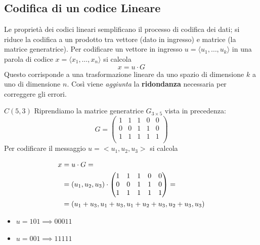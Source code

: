 \subsection{Codifica di un codice Lineare}
Le proprietà dei codici lineari semplificano il processo di codifica dei dati; si riduce la codifica a un prodotto tra vettore (dato in ingresso) e matrice (la matrice generatrice).
Per codificare un vettore in ingresso $u=\langle u_1,\dots,u_k \rangle$ in una parola di codice $x=\langle x_1,\dots,x_n\rangle$ si calcola
\[x=u \cdot G\]
Questo corrisponde a una trasformazione lineare da uno spazio di dimensione $k$ a uno di dimensione $n$. Così viene \textit{aggiunta} la \textbf{ridondanza} necessaria per correggere gli errori.

\begin{esempio}{$C(5,3)$}
Riprendiamo la matrice generatrice $G_{3 \times 5}$ vista in precedenza:
\[G= \begin{pmatrix}
    1 & 1 & 1 & 0 & 0\\
    0 & 0 & 1 & 1 & 0\\
    1 & 1 & 1 & 1 & 1\\
\end{pmatrix}\]
Per codificare il messaggio $u=<u_1,u_2,u_3>$ si calcola

\begin{align*}
    x &= u \cdot G = \\
      &= (u_1, u_2, u_3) \cdot 
    \begin{pmatrix}
        1 & 1 & 1 & 0 & 0 \\
        0 & 0 & 1 & 1 & 0 \\
        1 & 1 & 1 & 1 & 1 \\
    \end{pmatrix} = \\
      &= (u_1 + u_3, \space u_1 + u_3, \space u_1 + u_2 + u_3, \space u_2 + u_3, \space u_3)
\end{align*}
\begin{itemize}
    \item $u=101 \implies 00011$
    \item $u=001 \implies 11111$
\end{itemize}
\end{esempio}


